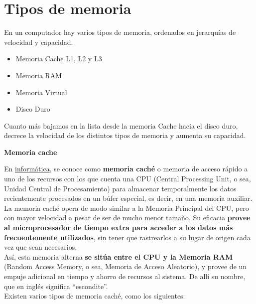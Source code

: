\documentclass[10pt,letterpaper]{article}
\begin{document}
\newpage
\section{Tipos de memoria} \label{conclusion}

\begin{justify}
	En un computador hay varios tipos de memoria, ordenados en jerarquías de velocidad y capacidad.\\
	
	\begin{itemize}
		\item Memoria Cache L1, L2 y L3
		\item Memoria RAM 
		\item Memoria Virtual 
		\item Disco Duro 
			
	\end{itemize}
	Cuanto más bajamos en la lista desde la memoria Cache hacia el disco duro, decrece la velocidad de los distintos tipos de memoria y aumenta su capacidad.\\
	
	\begin{center}
	\textbf{Memoria cache}
	\end{center}
	
	\noindent
	En \underline{informática}, se conoce como \textbf{memoria caché} o memoria de acceso rápido a uno de los recursos con los que cuenta una CPU (Central Processing Unit, o sea, Unidad Central de Procesamiento) para almacenar temporalmente los datos recientemente procesados en un búfer especial, es decir, en una memoria auxiliar.\\
	
	\noindent
	La memoria caché opera de modo similar a la Memoria Principal del CPU, pero con mayor velocidad a pesar de ser de mucho menor tamaño. Su eficacia \textbf{provee al microprocesador de tiempo extra para acceder a los datos más frecuentemente utilizados}, sin tener que rastrearlos a su lugar de origen cada vez que sean necesarios.\\
	
	\noindent
	Así, esta memoria alterna \textbf{se sitúa entre el CPU y la Memoria RAM} (Random Access Memory, o sea, Memoria de Acceso Aleatorio), y provee de un empuje adicional en tiempo y ahorro de recursos al sistema. De allí su nombre, que en inglés significa “escondite”.\\
	
	\noindent
	Existen varios tipos de memoria caché, como los siguientes:\\
	

\end{justify}
\end{document}
